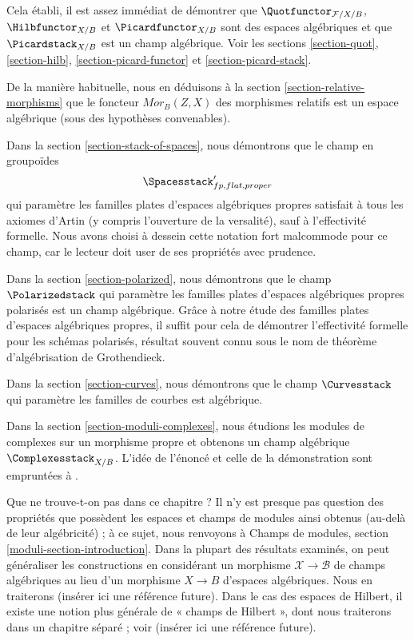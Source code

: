\medskip\noindent
Cela établi, il est assez immédiat de démontrer que
$\Quotfunctor_{\mathcal{F}/X/B}$, $\Hilbfunctor_{X/B}$ et
$\Picardfunctor_{X/B}$ sont des espaces algébriques et que
$\Picardstack_{X/B}$ est un champ algébrique. Voir les sections
\ref{section-quot}, \ref{section-hilb},
\ref{section-picard-functor} et \ref{section-picard-stack}.

\medskip\noindent
De la manière habituelle, nous en déduisons à la section
\ref{section-relative-morphisms} que le foncteur
$\mathit{Mor}_B(Z, X)$ des morphismes relatifs est un espace algébrique (sous
des hypothèses convenables).

\medskip\noindent
Dans la section \ref{section-stack-of-spaces}, nous démontrons que le champ en
groupoïdes
$$
\Spacesstack'_{fp, flat, proper}
$$
qui paramètre les familles plates d'espaces algébriques propres satisfait à
tous les axiomes d'Artin (y compris l'ouverture de la versalité), sauf à
l'effectivité formelle. Nous avons choisi à dessein cette notation fort
malcommode pour ce champ, car le lecteur doit user de ses propriétés avec
prudence.

\medskip\noindent
Dans la section \ref{section-polarized}, nous démontrons que le champ
$\Polarizedstack$ qui paramètre les familles plates d'espaces algébriques
propres polarisés est un champ algébrique. Grâce à notre étude des familles
plates d'espaces algébriques propres, il suffit pour cela de démontrer
l'effectivité formelle pour les schémas polarisés, résultat souvent connu
sous le nom de théorème d'algébrisation de Grothendieck.

\medskip\noindent
Dans la section \ref{section-curves}, nous démontrons que le champ
$\Curvesstack$ qui paramètre les familles de courbes est algébrique.

\medskip\noindent
Dans la section \ref{section-moduli-complexes}, nous étudions les modules de
complexes sur un morphisme propre et obtenons un champ algébrique
$\Complexesstack_{X/B}$. L'idée de l'énoncé et celle de la démonstration sont
empruntées à \cite{lieblich-complexes}.

\medskip\noindent
Que ne trouve-t-on pas dans ce chapitre ? Il n'y est presque pas question des
propriétés que possèdent les espaces et champs de modules ainsi obtenus (au-delà
de leur algébricité) ; à ce sujet, nous renvoyons à Champs de modules,
section \ref{moduli-section-introduction}. Dans la plupart des résultats
examinés, on peut généraliser les constructions en considérant un morphisme
$\mathcal{X} \to \mathcal{B}$ de champs algébriques au lieu d'un morphisme
$X \to B$ d'espaces algébriques. Nous en traiterons (insérer ici une référence
future). Dans le cas des espaces de Hilbert, il existe une notion plus générale
de « champs de Hilbert », dont nous traiterons dans un chapitre séparé ; voir
(insérer ici une référence future).




